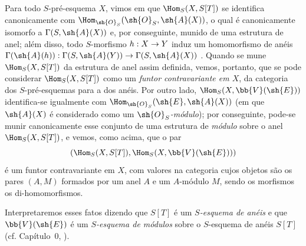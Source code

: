 \documentclass[oneside,10pt]{amsart}
\makeatletter
\newcommand{\ega@arrow}[2]{\mathchoice{#1}{#2}{#2}{#2}}
\renewcommand{\to}{\ega@arrow{\longrightarrow}{\rightarrow}}
\let\EGAOriginalLabel\label
\renewcommand{\label}[1]{\phantomsection\EGAOriginalLabel{#1}}
\makeatother
\begin{document}
\begin{env}[1.7.13]
\label{II.1.7.13}
Para todo $S$-pré-esquema $X$, vimos em  que $\Hom_S(X,S[T])$ se identifica canonicamente com $\Hom_{\sh{O}_S}(\sh{O}_S,\sh{A}(X))$, o qual é canonicamente isomorfo a $\Gamma(S,\sh{A}(X))$ e, por conseguinte, munido de uma estrutura de anel; além disso, todo $S$-morfismo $h:X\to Y$ induz um homomorfismo de anéis $\Gamma(\sh{A}(h)):\Gamma(S,\sh{A}(Y))\to\Gamma(S,\sh{A}(X))$ .
Quando se mune $\Hom_S(X,S[T])$ da estrutura de anel assim definida, vemos, portanto, que se pode considerar $\Hom_S(X,S[T])$ como um \emph{funtor contravariante em $X$}, da categoria dos $S$-pré-esquemas para a dos anéis.
Por outro lado, $\Hom_S(X,\bb{V}(\sh{E}))$ identifica-se igualmente com $\Hom_{\sh{O}_S}(\sh{E},\sh{A}(X))$ (em que $\sh{A}(X)$ é considerado como um \emph{$\sh{O}_S$-módulo}); por conseguinte, pode-se munir canonicamente esse conjunto de uma estrutura de \emph{módulo} sobre o anel $\Hom_S(X,S[T])$, e vemos, como acima, que o par
\[
  (\Hom_S(X,S[T]),\Hom_S(X,\bb{V}(\sh{E})))
\]
é um funtor contravariante em $X$, com valores na categoria cujos objetos são os pares $(A,M)$ formados por um anel $A$ e um $A$-módulo $M$, sendo os morfismos os di-homomorfismos.

Interpretaremos esses fatos dizendo que $S[T]$ é um \emph{$S$-esquema de anéis} e que $\bb{V}(\sh{E})$ é um \emph{$S$-esquema de módulos} sobre o $S$-esquema de anéis $S[T]$ (cf. Capítulo~0, ).
\end{env}
\end{document}
